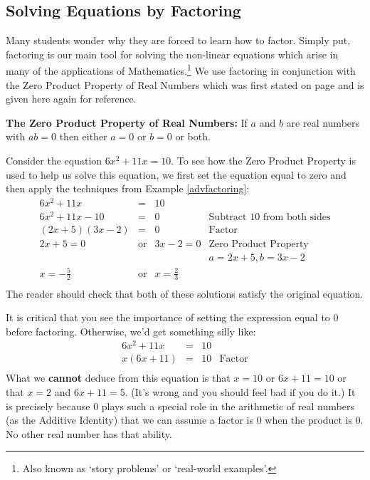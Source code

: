 \documentclass{ximera}
\begin{document}
\subsection{Solving Equations by Factoring}
\label{solveeqnsbyfactoring}

Many students wonder why they are forced to learn how to factor.  Simply put, factoring is our main tool for solving the non-linear equations which arise in many of the applications of Mathematics.\footnote{Also known as `story problems' or `real-world examples'.}  We use factoring in conjunction with the Zero Product Property of Real Numbers which was first stated on page \pageref{propertiesofzero} and is given here again for reference.

 
 

\textbf{The Zero Product Property of Real Numbers:}  If $a$ and $b$ are real numbers with $ab = 0$ then either $a = 0$ or $b = 0$ or both.


 

Consider the equation $6x^2 + 11x = 10$.  To see how the Zero Product Property is used to help us solve this equation, we first set the equation equal to zero and then apply the techniques from Example \ref{advfactoring}: \[ \begin{array}{rclr}
6x^2 + 11x & = & 10 \\
6x^2 + 11x - 10 & = & 0 & \text{Subtract $10$ from both sides} \\
(2x+5)(3x-2) & = & 0 & \text{Factor} \\
2x +5 = 0 & \text{or} & 3x -2 = 0 & \text{Zero Product Property} \\  
          &           &           & a = 2x+5, b = 3x-2 \\  
x = -\frac{5}{2} & \text{or} & x = \frac{2}{3} & \\ \end{array} \] The reader should check that both of these solutions satisfy the original equation.

 

It is critical that you see the importance of setting the expression equal to $0$ before factoring. Otherwise, we'd get something silly like: \[ \begin{array}{rclr}

6x^2 + 11x & = & 10 \\
x(6x + 11) & = & 10 & \text{Factor} \\
\end{array} \] What we \textbf{cannot} deduce from this equation is that $x = 10$ or $6x+11 = 10$ or that $x = 2$ and $6x+11 = 5$.  (It's wrong and you should feel bad if you do it.)  It is precisely because $0$ plays such a special role in the arithmetic of real numbers (as the Additive Identity) that we can assume a factor is $0$ when the product is $0$.  No other real number has that ability.
\end{document}
